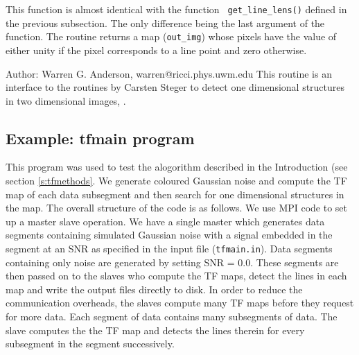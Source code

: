 This function is almost identical with the function {\tt
get\_line\_lens()} defined in the previous subsection. The only
difference being the last argument of the function. The routine
returns a map ({\tt out\_img}) whose pixels have the value of either
unity if the pixel corresponds to a line point and zero otherwise.


\noindent Author: Warren G. Anderson, warren@ricci.phys.uwm.edu
This routine is an interface to the routines by Carsten Steger to
detect one dimensional structures in two dimensional images, 
\cite{Stegerscode,Stegerspap}.

\newpage

\subsection{Example: tfmain program}

This program was used to test the alogorithm described in the
Introduction (see section \ref{s:tfmethods}. We generate coloured
Gaussian noise and compute the TF map of each data subsegment and then
search for one dimensional structures in the map. The overall
structure of the code is as follows. We use
MPI code to set up a master slave operation. We have a single master
which generates data segments containing simulated Gaussian noise with
a signal embedded in the segment at an  SNR as specified in
the input file ({\tt tfmain.in}). Data segments containing only noise are
generated by setting SNR = $0.0$.
These segments are then passed on to the
slaves who compute the TF maps, detect the lines in each map and
write the output files directly to disk. In order to reduce the
communication overheads, the slaves compute many TF maps before they
request for more data. Each segment of data contains many subsegments
of data.  The slave computes the the TF map
and detects the lines therein for every subsegment in the segment
successively.

